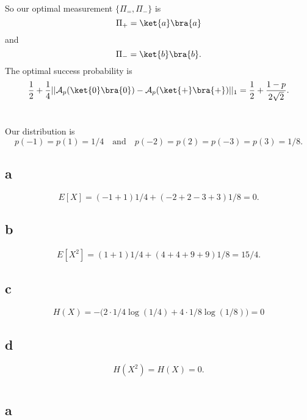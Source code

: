 \documentclass[letterpaper,12pt,oneside,onecolumn]{article}
\newcommand{\cA}{\mathcal{A}} \newcommand{\cB}{\mathcal{B}}
\begin{document}
\paragraph{}
So our optimal measurement $\{\Pi_=, \Pi_-\}$ is
$$\Pi_+ = \ket{a}\bra{a}$$
and
$$\Pi_- = \ket{b}\bra{b}.$$
The optimal success probability is
$$\frac{1}{2} + \frac{1}{4}||\cA_p(\ket{0}\bra{0}) - \cA_p(\ket{+}\bra{+})||_1 = \frac{1}{2} +\frac{1-p}{2\sqrt{2}}. $$
\newpage
\section{}
Our distribution is 
$$p(-1)=p(1) = 1/4 \quad\text{and}\quad p(-2)=p(2)=p(-3)=p(3)=1/8.$$
\subsection{a}
$$E[X] = (-1 + 1)1/4 + (-2+2-3+3)1/8 = 0.$$
\subsection{b}
$$E[X^2] = (1+1)1/4 + (4+4+9+9)1/8 = 15/4.$$
\subsection{c}
$$H(X) = -\big( 2\cdot 1/4\log(1/4) + 4\cdot 1/8\log(1/8)  \big) = 0$$
\subsection{d}
$$H(X^2) = H(X) = 0.$$
\newpage
\section{}
\subsection{a}
\end{document}
